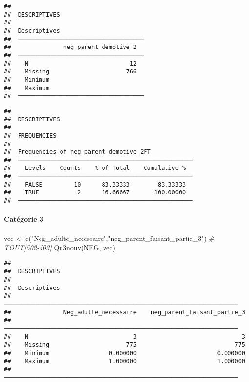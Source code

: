 \documentclass[
]{article}
\newenvironment{Shaded}{\begin{snugshade}}{\end{snugshade}}
\newcommand{\CommentTok}[1]{\textcolor[rgb]{0.56,0.35,0.01}{\textit{#1}}}
\newcommand{\FunctionTok}[1]{\textcolor[rgb]{0.00,0.00,0.00}{#1}}
\newcommand{\NormalTok}[1]{#1}
\newcommand{\OtherTok}[1]{\textcolor[rgb]{0.56,0.35,0.01}{#1}}
\newcommand{\StringTok}[1]{\textcolor[rgb]{0.31,0.60,0.02}{#1}}
\begin{document}
\begin{verbatim}
## 
##  DESCRIPTIVES
## 
##  Descriptives                         
##  ──────────────────────────────────── 
##               neg_parent_demotive_2   
##  ──────────────────────────────────── 
##    N                             12   
##    Missing                      766   
##    Minimum                            
##    Maximum                            
##  ────────────────────────────────────
\end{verbatim}

\begin{verbatim}
## 
##  DESCRIPTIVES
## 
##  FREQUENCIES
## 
##  Frequencies of neg_parent_demotive_2FT             
##  ────────────────────────────────────────────────── 
##    Levels    Counts    % of Total    Cumulative %   
##  ────────────────────────────────────────────────── 
##    FALSE         10      83.33333        83.33333   
##    TRUE           2      16.66667       100.00000   
##  ──────────────────────────────────────────────────
\end{verbatim}

\hypertarget{catuxe9gorie-3-6}{%
\paragraph{Catégorie 3}\label{catuxe9gorie-3-6}}

\begin{Shaded}
\begin{Highlighting}[]
\NormalTok{vec }\OtherTok{\textless{}{-}} \FunctionTok{c}\NormalTok{(}\StringTok{"Neg\_adulte\_necessaire"}\NormalTok{,}\StringTok{"neg\_parent\_faisant\_partie\_3"}\NormalTok{)  }\CommentTok{\# TOUT[502{-}503]}
\FunctionTok{Qu3nouv}\NormalTok{(NEG, vec)}
\end{Highlighting}
\end{Shaded}

\begin{verbatim}
## 
##  DESCRIPTIVES
## 
##  Descriptives                                                        
##  ─────────────────────────────────────────────────────────────────── 
##               Neg_adulte_necessaire    neg_parent_faisant_partie_3   
##  ─────────────────────────────────────────────────────────────────── 
##    N                              3                              3   
##    Missing                      775                            775   
##    Minimum                 0.000000                       0.000000   
##    Maximum                 1.000000                       1.000000   
##  ───────────────────────────────────────────────────────────────────
\end{verbatim}
\end{document}

